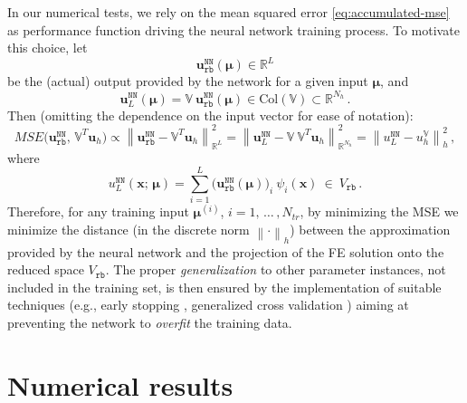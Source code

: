 \documentclass[longtitle]{elsarticle}
\numberwithin{equation}{section}
\theoremstyle{theorem}
\theoremstyle{definition}
\theoremstyle{remark}
\theoremstyle{proposition}
\numberwithin{figure}{section}
\newcommand{\norm}[1]{\left\lVert#1\right\rVert}
\newcommand{\bg}[1]{\boldsymbol{#1}}
\begin{document}
		In our numerical tests, we rely on the mean squared error \eqref{eq:accumulated-mse} as performance function driving the neural network training process. To motivate this choice, let 
		\begin{equation*}
			\mathbf{u}_{\texttt{rb}}^{\texttt{NN}}(\bg{\mu}) \in \mathbb{R}^L
		\end{equation*}
		be the (actual) output provided by the network for a given input $\bg{\mu}$, and 
		\begin{equation*}
			\mathbf{u}_L^{\texttt{NN}}(\bg{\mu}) = \mathbb{V} ~ \mathbf{u}_{\texttt{rb}}^{\texttt{NN}}(\bg{\mu}) \in \text{Col}(\mathbb{V}) \subset \mathbb{R}^{N_h} \, . 
		\end{equation*}
		Then (omitting the dependence on the input vector for ease of notation):
		\begin{equation*}
			\label{eq:pod-nn-mse}
				MSE \big( \mathbf{u}_{\texttt{rb}}^{\texttt{NN}}, \, \mathbb{V}^T \mathbf{u}_h \big) \propto \norm{\mathbf{u}_{\texttt{rb}}^{\texttt{NN}} - \mathbb{V}^T \mathbf{u}_h}^2_{\mathbb{R}^L} = \norm{\mathbf{u}_L^{\texttt{NN}} - \mathbb{V} ~ \mathbb{V}^T \mathbf{u}_h}^2_{\mathbb{R}^{N_h}} = \norm{u_L^{\texttt{NN}} - u_h^{\mathbb{V}}}^2_h \, ,
		\end{equation*} 
		where
		\begin{equation*}
			\label{eq:pod-nn-solution}
			u_L^{\texttt{NN}}(\bg{x}; \, \bg{\mu}) = \sum_{i = 1}^L \big( \mathbf{u}_{\texttt{rb}}^{\texttt{NN}}(\bg{\mu}) \big)_i ~ \psi_i(\bg{x}) ~ \in ~ V_{\texttt{rb}} \, .
		\end{equation*}
		Therefore, for any training input $\bg{\mu}^{(i)}$, $i = 1, \, \ldots \, , N_{tr}$, by minimizing the MSE we minimize the distance (in the discrete norm $\norm{\cdot}_h$) between the approximation provided by the neural network and the projection of the FE solution onto the reduced space $V_{\texttt{rb}}$. The proper \emph{generalization} to other parameter instances, not included in the training set, is then ensured by the implementation of suitable techniques (e.g., early stopping \cite{Mat16}, generalized cross validation \cite{Koh95}) aiming at preventing the network to \emph{overfit} the training data.
		
			
	
	\section{Numerical results}
	\label{section:Numerical results}
	
\end{document}
